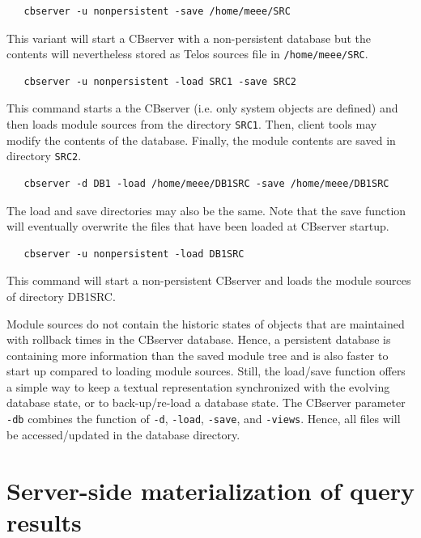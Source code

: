\begin{verbatim}
   cbserver -u nonpersistent -save /home/meee/SRC
\end{verbatim}

This variant will start a CBserver with a non-persistent database but the contents will nevertheless
stored as Telos sources file in {\tt /home/meee/SRC}.


\begin{verbatim}
   cbserver -u nonpersistent -load SRC1 -save SRC2
\end{verbatim}

This command starts a the CBserver (i.e. only system objects are defined) and then
loads module sources from the directory {\tt SRC1}. Then, client tools may
modify the contents of the database. Finally, the module contents are saved in 
directory {\tt SRC2}.

\begin{verbatim}
   cbserver -d DB1 -load /home/meee/DB1SRC -save /home/meee/DB1SRC
\end{verbatim}

The load and save directories may also be the same. Note that the save function
will eventually overwrite the files that have been loaded at CBserver startup.

\begin{verbatim}
   cbserver -u nonpersistent -load DB1SRC 
\end{verbatim}

This command will start a non-persistent CBserver and loads the module sources of
directory DB1SRC. 


Module sources do not contain the historic states of objects that are
maintained with rollback times in the CBserver database. Hence, a persistent database
is containing more information than the saved module tree and is also faster to
start up compared to loading module sources. Still, the load/save function offers
a simple way to keep a textual representation synchronized with the 
evolving database state, or to back-up/re-load a database state. 
The CBserver parameter {\tt -db}  combines the function of {\tt -d}, {\tt -load}, 
{\tt -save}, and {\tt -views}. Hence, all files will be accessed/updated in
the database directory.






\section{Server-side materialization of query results} \label{sec:module_views}

